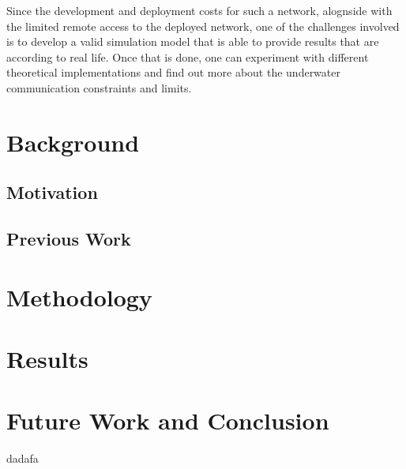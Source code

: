 \documentclass[a4paper]{IEEEtran}
\begin{document}
Since the development and deployment costs for such a network, alognside with the limited remote access to the deployed network,  one of the challenges involved is to develop a valid simulation model that is able to provide results that are according to real life. Once that is done, one can experiment with different theoretical implementations and find out more about the underwater communication constraints and limits.

\section{Background}

\subsection{Motivation}

\subsection{Previous Work}

\section{Methodology}

\section{Results}

\section{Future Work and Conclusion}

\begin{thebibliography}{99}
 dadafa
\end{thebibliography}
\end{document}
